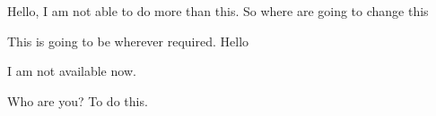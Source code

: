 \documentclass{article}
\begin{document}
Hello, I am not able to do more than this. So where are going to change this

This is going to be wherever required. Hello

I am not available now.

Who are you? To do this. 
\end{document}
